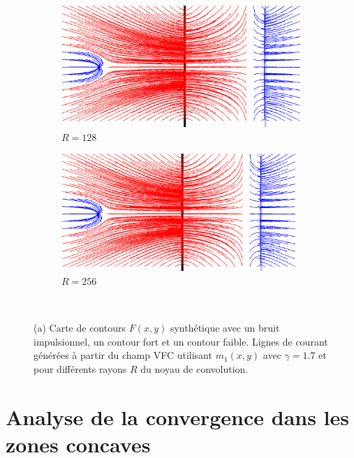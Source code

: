 \begin{appendices}
\begin{figure}[H]
   \begin{subfigure}[c]{.5\linewidth}
     \centering
     \includegraphics[width=\textwidth]{Chapters/Images/m1_radius_128.png}
     \caption{$R=128$}
   \end{subfigure}
   \begin{subfigure}[c]{.5\linewidth}
     \centering
     \includegraphics[width=\textwidth]{Chapters/Images/m1_radius_256.png}
     \caption{$R=256$}
   \end{subfigure}\\
   
   \caption{(a) Carte de contours $F(x,y)$ synthétique avec un bruit impulsionnel, un contour fort et un contour faible. Lignes de courant générées à partir du champ VFC utilisant $m_1(x,y)$ avec $\gamma=1.7$ et pour différents rayons $R$ du noyau de convolution.}
   \label{fig:taille}
\end{figure}
\section{Analyse de la convergence dans les zones concaves}
\label{ann_concavities_results}


\end{appendices}
